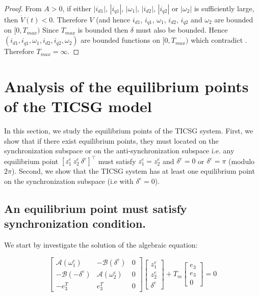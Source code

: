 \documentclass[letterpaper, 10 pt, conference]{ieeeconf}
\renewcommand{\o}    {{\omega}}
\begin{document}
\begin{proof}
From $A>0$, if either $|i_{d1}|$, $|i_{q1}|$, $|\o_1|$, $|i_{d2}|$,
$|i_{q2}|$ or $|\o_2|$ is sufficiently large, then
$\dot{V}(t)<0$. Therefore $V$ (and hence $i_{d1}$, $i_{q1}$, $\o_1$,
$i_{d2}$, $i_{q2}$ and $\o_2$ are bounded on $[0,T_{max})$ Since
$T_{max}$ is bounded then $\delta$ must also be bounded. Hence
$(i_{d1},i_{q1},\o_1,i_{d2},i_{q2},\o_2)$ are bounded functions on
$[0,T_{max})$ which contradict \cite[Corollary II.3]{JayWeissBS:09}. 
Therefore $T_{max} = \infty$.
\end{proof}


\section{Analysis of the equilibrium points of the TICSG model \label{sec:equivalence_pont}}

In this section, we study the equilibrium points of the TICSG system. First, we show that  if there exist equilibrium points, they must located on the synchronization subspace or on the anti-synchronization subspace i.e. any equilibrium point $\left[z_1^e \ z_2^e \ \delta^e \right]^\top$ must satisfy $z_1^e=z_2^e$ and $\delta^e=0$ or $\delta^e = \pi$   (modulo $2\pi$). Second, we show that the TICSG system has at least one equilibrium point on the synchronization subspace (i.e with $\delta^e=0$).

\subsection{An equilibrium point must satisfy synchronization condition.}
We  start by investigate the solution of the algebraic equation:  

\begin{equation}
\left[\begin{array}{c|c|c}
\mathcal{A}(\omega_{1}^{e}) & -\mathcal{B}(\delta^{e}) & 0\\
\hline -\mathcal{B}(-\delta^{e}) & \mathcal{A}(\omega_{2}^{e}) & 0\\
\hline -e_{3}^{T} & e_{3}^{T} & 0
\end{array}\right]\left[\begin{array}{c}
z_{1}^{e}\\
z_{2}^{e}\\
\delta^{e}
\end{array}\right]+T_{m}\left[\begin{array}{c}
e_{3}\\
e_{3}\\
0
\end{array}\right]=0
\label{eq:algebricEquation}
\end{equation}
\end{document}

